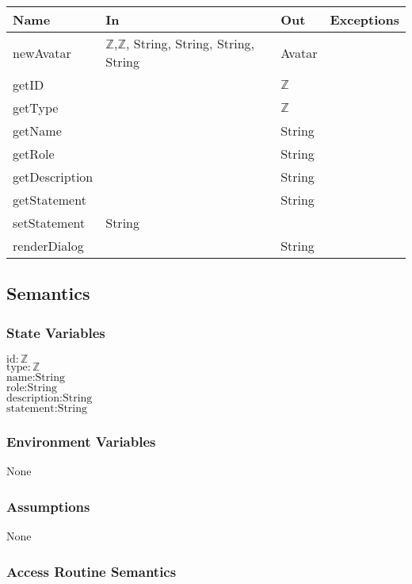 \documentclass[12pt, titlepage]{article}
\begin{document}
\begin{center}
\begin{tabular}{p{3cm} p{4cm} p{4cm} p{2cm}}
\hline
\textbf{Name} & \textbf{In} & \textbf{Out} & \textbf{Exceptions} \\
\hline
newAvatar & $\mathbb{Z}$,$\mathbb{Z}$, String, String, String, String & Avatar & \\
\hline
getID &  & $\mathbb{Z}$ & \\
\hline
getType &  & $\mathbb{Z}$ & \\
\hline
getName &  & String & \\
\hline
getRole &  & String & \\
\hline
getDescription &  & String & \\
\hline
getStatement &  & String & \\
\hline
setStatement &  String &  & \\
\hline
renderDialog &   & String & \\
\hline
\end{tabular}
\end{center}

\subsection{Semantics}

\subsubsection{State Variables}
$\text{id}: \text{$\mathbb{Z}$}$\\
$\text{type}: \text{$\mathbb{Z}$}$\\
$\text{name}: \text{String}$\\
$\text{role}: \text{String}$\\
$\text{description}: \text{String}$\\
$\text{statement}: \text{String}$\\

\subsubsection{Environment Variables}
None

\subsubsection{Assumptions}
None

\subsubsection{Access Routine Semantics}
\end{document}
